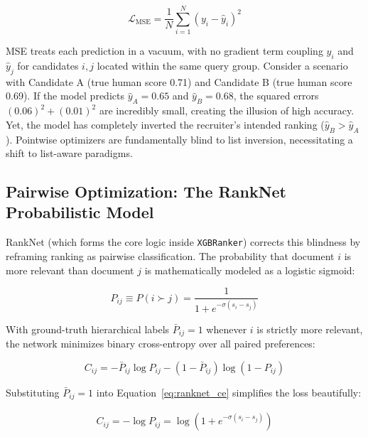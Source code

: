 \begin{equation}
\mathcal{L}_{\text{MSE}} = \frac{1}{N}\sum_{i=1}^{N}(y_i - \hat{y}_i)^2
\label{eq:mse}
\end{equation}

MSE treats each prediction in a vacuum, with no gradient term coupling $\hat{y}_i$ and $\hat{y}_j$ for candidates $i, j$ located within the same query group. Consider a scenario with Candidate A (true human score 0.71) and Candidate B (true human score 0.69). If the model predicts $\hat{y}_A = 0.65$ and $\hat{y}_B = 0.68$, the squared errors $(0.06)^2 + (0.01)^2$ are incredibly small, creating the illusion of high accuracy. Yet, the model has completely inverted the recruiter's intended ranking ($\hat{y}_B > \hat{y}_A$). Pointwise optimizers are fundamentally blind to list inversion, necessitating a shift to list-aware paradigms.

\subsection{Pairwise Optimization: The RankNet Probabilistic Model}
\label{subsec:ranknet}

RankNet (which forms the core logic inside \texttt{XGBRanker}) corrects this blindness by reframing ranking as pairwise classification. The probability that document $i$ is more relevant than document $j$ is mathematically modeled as a logistic sigmoid:

\begin{equation}
P_{ij} \equiv P(i \succ j) = \frac{1}{1 + e^{-\sigma(s_i - s_j)}}
\label{eq:ranknet_prob}
\end{equation}

\vspace{0.5em}

With ground-truth hierarchical labels $\bar{P}_{ij} = 1$ whenever $i$ is strictly more relevant, the network minimizes binary cross-entropy over all paired preferences:

\begin{equation}
C_{ij} = -\bar{P}_{ij}\log P_{ij} - (1-\bar{P}_{ij})\log(1-P_{ij})
\label{eq:ranknet_ce}
\end{equation}

\vspace{0.5em}

Substituting $\bar{P}_{ij}=1$ into Equation~\eqref{eq:ranknet_ce} simplifies the loss beautifully:

\begin{align}
C_{ij} = -\log P_{ij} = \log\!\left(1+e^{-\sigma(s_i-s_j)}\right)
\label{eq:ranknet_derivation}
\end{align}

